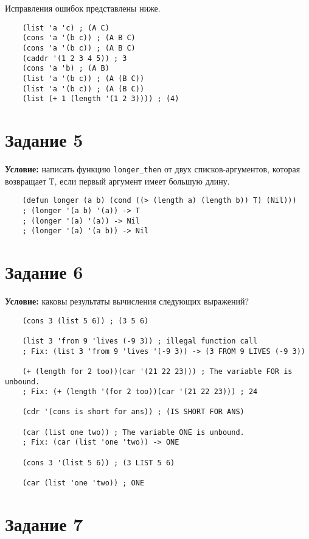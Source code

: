 Исправления ошибок представлены ниже.

\begin{lstlisting}
	(list 'a 'c) ; (A C)
	(cons 'a '(b c)) ; (A B C)
	(cons 'a '(b c)) ; (A B C)
	(caddr '(1 2 3 4 5)) ; 3
	(cons 'a 'b) ; (A B)
	(list 'a '(b c)) ; (A (B C))
	(list 'a '(b c)) ; (A (B C))
	(list (+ 1 (length '(1 2 3)))) ; (4)
\end{lstlisting}


\section{Задание 5}

\textbf{Условие:} написать функцию \texttt{longer\_then} от двух списков-аргументов, которая возвращает Т, если первый аргумент имеет большую длину.

\begin{lstlisting}
	(defun longer (a b) (cond ((> (length a) (length b)) T) (Nil)))
	; (longer '(a b) '(a)) -> T
	; (longer '(a) '(a)) -> Nil
	; (longer '(a) '(a b)) -> Nil
\end{lstlisting}


\section{Задание 6}

\textbf{Условие:} каковы результаты вычисления следующих выражений?

\begin{lstlisting}
	(cons 3 (list 5 6)) ; (3 5 6)

	(list 3 'from 9 'lives (-9 3)) ; illegal function call
	; Fix: (list 3 'from 9 'lives '(-9 3)) -> (3 FROM 9 LIVES (-9 3))

	(+ (length for 2 too))(car '(21 22 23))) ; The variable FOR is unbound.
	; Fix: (+ (length '(for 2 too))(car '(21 22 23))) ; 24

	(cdr '(cons is short for ans)) ; (IS SHORT FOR ANS)

	(car (list one two)) ; The variable ONE is unbound.
	; Fix: (car (list 'one 'two)) -> ONE

	(cons 3 '(list 5 6)) ; (3 LIST 5 6)

	(car (list 'one 'two)) ; ONE
\end{lstlisting}


\section{Задание 7}

